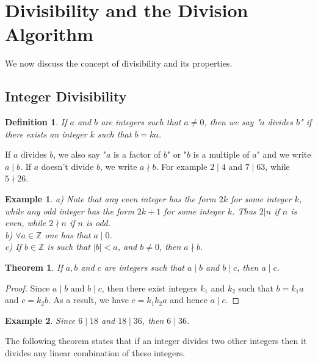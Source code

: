 \documentclass[12pt,letterpaper]{book}
\newtheorem{definition}{Definition}
\newtheorem{theorem}{Theorem}
\newtheorem{example}{Example}
\begin{document}
\newpage

\section{Divisibility and the Division Algorithm}

We now discuss the concept of divisibility and its properties.

\subsection{Integer Divisibility}
\begin{definition}
If $a$ and $b$ are integers such that $a\neq 0$, then we say "$a$
divides $b$" if there exists an integer $k$ such that $b=ka$.
\end{definition}
  If $a$ divides $b$, we also say "$a$
is a factor of $b$" or "$b$ is a multiple of $a$" and we write
$a\mid b$. If $a$ doesn't divide $b$, we write $a\nmid b$. For
example $2\mid 4$ and $7\mid 63$, while $5\nmid 26$.

\begin{example}
a) Note that any even integer has the form $2k$ for some integer $k$, while any odd integer has the form $2k+1$ for some integer $k$. Thus $2|n$ if $n$ is even,
while $2\nmid n$ if $n$ is odd.\\
b) $\forall a\in\mathbb{Z}$ one has that $a\mid 0$.\\
c) If $b\in\mathbb{Z}$ is such that $|b|<a$, and $b\neq 0$, then $a\nmid b$.
\end{example}

\begin{theorem}
If $a, b$ and $c$ are integers such that $a\mid b$ and $b\mid c$,
then $a\mid c$.
\end{theorem}

\begin{proof}
Since $a\mid b$ and $b\mid c$, then there exist integers $k_1$ and
$k_2$ such that $b=k_1a$ and $c=k_2b$.  As a result, we have
$c=k_1k_2a$ and hence $a\mid c$.
\end{proof}

\begin{example}
Since $6\mid 18$ and $18\mid 36$, then $6\mid 36$.
\end{example}

The following theorem states that if an integer divides two other
integers then it divides any linear combination of these integers.
\end{document}
